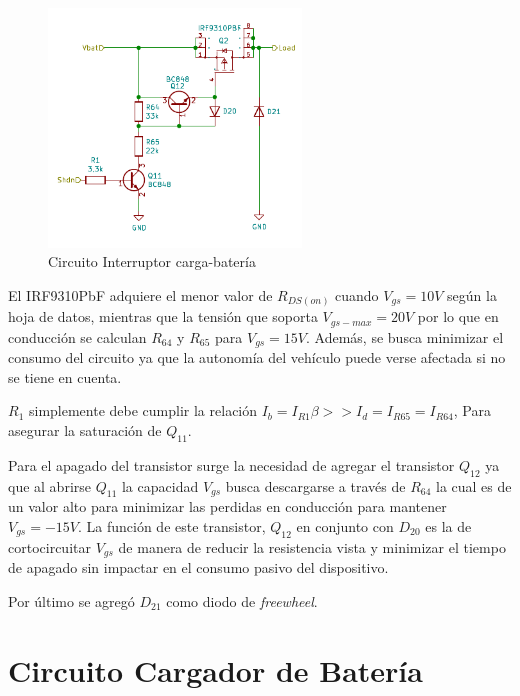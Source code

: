 \documentclass[10pt, a4paper]{report}
\begin{document}
\begin{figure}[h!]
	\begin{center}
		\includegraphics[width=0.6\textwidth]{kcd_bat_load_switch.pdf}
		\caption{Circuito Interruptor carga-batería}
		\label{load_sw_sch}
	\end{center}
\end{figure}
\FloatBarrier

El IRF9310PbF adquiere el menor valor de $R_{DS(on)}$ cuando $V_{gs} = 10V$
según la hoja de datos\cite{IRF9310}, mientras que la tensión que soporta
$V_{gs-max}=20V$ por lo que en conducción se calculan $R_{64}$ y $R_{65}$ para
$V_{gs}=15V$.
Además, se busca minimizar el consumo del circuito ya que la autonomía del
vehículo puede verse afectada si no se tiene en cuenta.

$R_1$ simplemente debe cumplir la relación $I_b = I_{R1} \beta >> I_d = I_{R65}
= I_{R64}$, Para asegurar la saturación de $Q_{11}$. 

Para el apagado del transistor surge la necesidad de agregar el transistor
$Q_{12}$ ya que al abrirse $Q_{11}$ la capacidad $V_{gs}$ busca descargarse a
través de $R_{64}$ la cual es de un valor alto para minimizar las perdidas en
conducción para mantener $V_{gs}=-15V$. La función de este transistor, $Q_{12}$
en conjunto con $D_{20}$ es la de cortocircuitar $V_{gs}$ de manera de reducir
la resistencia vista y minimizar el tiempo de apagado sin impactar en el consumo
pasivo del dispositivo.

Por último se agregó $D_{21}$ como diodo de \emph{freewheel}.

\section{Circuito Cargador de Batería}
\end{document}
